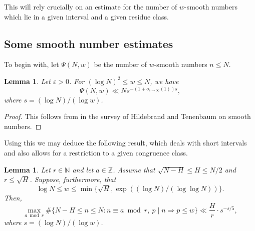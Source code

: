 \documentclass[11pt,letterpaper]{amsart}
\renewcommand{\leq}{\leqslant}
\newtheorem{lemma}[theorem]{Lemma}
\theoremstyle{definition}
\numberwithin{equation}{section}
\newcommand\ZZ{\mathbb{Z}}
\newcommand\NN{\mathbb{N}}
\newcommand{\0}{\mathbf{0}}
\begin{document}
This will rely crucially on an estimate
 for the number of $w$-smooth numbers which lie in  a given  interval and a given  residue class.
 
\subsection{Some smooth number estimates} 

To begin with, let  $\Psi(N,w)$ be the number of $w$-smooth numbers $n\leq N$. 


\begin{lemma}\label{lem:friable'}
Let $\varepsilon>0$. For $(\log N)^{2}\leq w\leq N$, we have
$$
\Psi(N,w)\ll Ns^{-(1+o_{s\to \infty}(1))s},
$$
where  $s=(\log N)/(\log w)$.
\end{lemma}

\begin{proof}
This follows from 
\cite[Cor.~1.3]{adolf} 
in the survey of Hildebrand and Tenenbaum on smooth numbers.
\end{proof}

Using this we may deduce the following result, which deals with short intervals and also allows for a restriction to a given congruence class.
 
 
 \begin{lemma}\label{lem:friable}
Let $r\in \NN$ and let  $a\in \ZZ$. Assume that 
$\sqrt{N-H}\leq H\leq N/2$ and $r\leq \sqrt{H}$. Suppose, furthermore, that 
$$\log N\leq w\leq \min\{\sqrt{H},\exp((\log N)/(\log \log N))\}.
$$ 
Then, 
$$	
\max_{a\bmod r}\#\{N-H\leq n\leq N: n\equiv a\bmod{r}, ~p\mid n \Rightarrow p\leq w\} \ll \frac{H}{r}\cdot s^{-s/5}, 
$$
where $s=(\log N)/(\log w)$.
\end{lemma}
\end{document}
